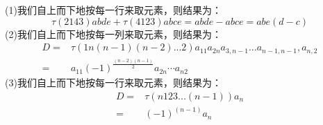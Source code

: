 \begin{solution}{}{}
    (1)我们自上而下地按每一行来取元素，则结果为：
    \[\tau{(2143)}abde+\tau{(4123)abce}=abde-abce=abe(d-c)\]
    (2)我们自上而下地按每一列来取元素，则结果为：\vspace{-5pt}
    \begin{align*}
    D=&\tau{(1n(n-1)(n-2)...2)}a_{11}a_{2n}a_{3,n-1}...a_{n-1,n-1},a_{n,2}\\
    =&a_{11}(-1)^{\frac{(n-2)(n-1)}{2}}a_{2n}\cdots a_{n2}\end{align*}
    (3)我们自上而下地按每一行来取元素，则结果为：\vspace{-5pt}
    \begin{align*}
    D=&\tau{(n123...(n-1))}a_n\\
    =&(-1)^{(n-1)}a_n
    \end{align*}
\end{solution}